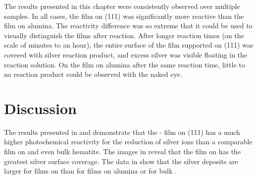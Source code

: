 The results presented in this chapter were consistently observed over multiple samples. In
all cases, the film on (111) was significantly more reactive than the film on
alumina. The reactivity difference was so extreme that it could be used to visually
distinguish the films after reaction. After longer reaction times (on the scale of minutes
to an hour), the entire surface of the film supported on (111) was covered with
silver reaction product, and excess silver was visible floating in the reaction solution.
On the film on alumina after the same reaction time, little to no reaction product could
be observed with the naked eye.


\section{Discussion}
\label{sec:single.crystal.discussion}


The results presented in  and 
demonstrate that the \textalpha- film on (111) has a much higher
photochemical reactivity for the reduction of silver ions than a comparable film on
 and even bulk hematite.  The images in  reveal that
the film on  has the greatest silver surface coverage. The data in
 show that the silver deposits are larger for films on 
than for films on alumina or for bulk . 

